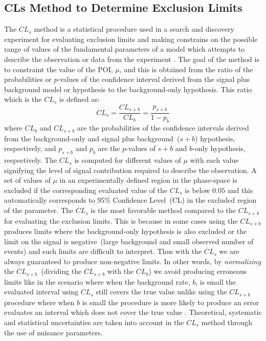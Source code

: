 \subsection{CLs Method to Determine Exclusion Limits}
The $CL_{s}$ method is a statistical procedure used in a search and discovery experiment for evaluating exclusion limits and making constrains on the possible range of values of the fundamental parameters of a model which attempts to describe the observation or data from the experiment \cite{CLS}. The goal of the method is to constraint the value of the POI, $\mu$, and this is obtained from the ratio of the probabilities or $p$-values of the confidence interval derived from the signal plus background model or hypothesis to the background-only hypothesis. This ratio which is the $CL_{s}$ is defined as: 
\begin{equation}
CL_{s}  =  \frac{CL_{s+b}}{CL_{b}}  = \frac{p_{s+b}}{1 - p_{b}}
\end{equation}
where $CL_{b}$ and $CL_{s+b}$ are the  probabilities of the confidence intervals derived from the background-only and signal plus background~($s+b$) hypothesis, respectively, and $p_{s+b}$ and $p_{b}$ are the $p$-values of $s+b$ and $b$-only hypothesis, respectively. 
The $CL_{s}$ is computed for different values of $\mu$ with each value signifying the level of signal contribution required to describe the observation. A set of values of $\mu$ in an experimentally defined region in the phase-space is excluded if the corresponding evaluated value of the $CL_{s}$ is below $0.05$ and this automatically corresponds to 95\% Confidence Level~(CL) in the excluded region of the parameter.
\newline
The $CL_{s}$ is the most favorable method compared to the $CL_{s+b}$ for evaluating the exclusion limits. This is because in some cases using the $CL_{s+b}$ produces limits where the background-only hypothesis is also excluded or the limit on the signal is negative~(large background and small observed number of events) and such limits are difficult to interpret. Thus with the $CL_{s}$ we are always guaranteed to produce non-negative limits. In other words, by \textit{normalizing} the $CL_{s+b}$~(dividing the $CL_{s+b}$ with the $CL_{b}$) we avoid producing erroneous limits like in the scenario where when the background rate, $b$, is small the evaluated interval using $CL_{s}$ still covers the true value unlike using the $CL_{s+b}$ procedure where when $b$ is small the procedure is more likely to produce an error \ie evaluates an interval which does not cover the true value \cite{LIM}. 
\newline
Theoretical, systematic and statistical uncertainties are taken into account in the $CL_{s}$ method through the use of nuisance parameters.


